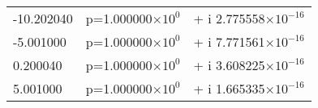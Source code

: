 \documentclass[aps,prc,reprint,noshowpacs,groupedaddress,onecolumn]{revtex4}
\begin{document}
\begin{table}
\begin{tabular}{lll}
-10.202040 & p=1.000000$\times 10^0$ &+ i 2.775558$\times 10^{-16}$ \\
-5.001000  & p=1.000000$\times 10^0$ &+ i 7.771561$\times 10^{-16}$ \\
0.200040   &p=1.000000$\times 10^0$ &+ i 3.608225$\times 10^{-16}$ \\
5.001000   &p=1.000000$\times 10^0$ &+ i 1.665335$\times 10^{-16}$ \\

\end{tabular}
\end{table}
\end{document}
